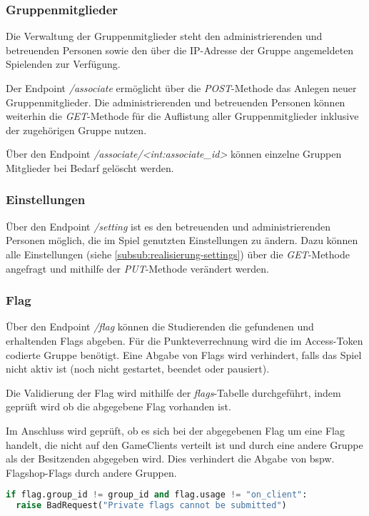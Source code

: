 \subsubsection{Gruppenmitglieder}
Die Verwaltung der Gruppenmitglieder steht den administrierenden und betreuenden Personen sowie den über die IP-Adresse der Gruppe angemeldeten Spielenden zur Verfügung.

Der Endpoint \textit{/associate} ermöglicht über die \textit{POST}-Methode das Anlegen neuer Gruppenmitglieder. Die administrierenden und betreuenden Personen können weiterhin die \textit{GET}-Methode für die Auflistung aller Gruppenmitglieder inklusive der zugehörigen Gruppe nutzen.

Über den Endpoint \textit{/associate/<int:associate\_id>} können einzelne Gruppen Mitglieder bei Bedarf gelöscht werden.

\subsubsection{Einstellungen}
Über den Endpoint \textit{/setting} ist es den betreuenden und administrierenden Personen möglich, die im Spiel genutzten Einstellungen zu ändern. Dazu können alle Einstellungen (siehe \autoref{subsub:realisierung-settings}) über die \textit{GET}-Methode angefragt und mithilfe der \textit{PUT}-Methode verändert werden.

\subsubsection{Flag}
Über den Endpoint \textit{/flag} können die Studierenden die gefundenen und erhaltenden Flags abgeben. Für die Punkteverrechnung wird die im Access-Token codierte Gruppe benötigt. Eine Abgabe von Flags wird verhindert, falls das Spiel nicht aktiv ist (noch nicht gestartet, beendet oder pausiert).

Die Validierung der Flag wird mithilfe der \textit{flags}-Tabelle durchgeführt, indem geprüft wird ob die abgegebene Flag vorhanden ist.

Im Anschluss wird geprüft, ob es sich bei der abgegebenen Flag um eine Flag handelt, die nicht auf den GameClients verteilt ist und durch eine andere Gruppe als der Besitzenden abgegeben wird. Dies verhindert die Abgabe von bspw. Flagshop-Flags durch andere Gruppen. 

\begin{lstlisting}[language=Python, frame=single, caption={GIS Abgabe privater Flags verhindern}, captionpos=b, label={lst:gis-prevent-submitting-private-flags}]
if flag.group_id != group_id and flag.usage != "on_client":
  raise BadRequest("Private flags cannot be submitted")
\end{lstlisting}


